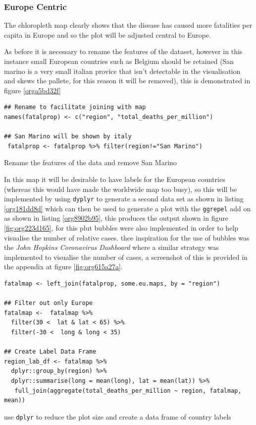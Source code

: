 \documentclass[11pt]{article}
\begin{document}
\subsubsection{Europe Centric}
\label{sec:org70b837a}
The chloropleth map clearly shows that the disease has caused more fatalities
per capita in Europe and so the plot will be adjusted central to Europe.

As before it is necessary to rename the features of the dataset, however in this
instance small European countries such as Belgium should be retained (San marino
is a very small italian provice that isn't detectable in the visualisation and
skews the pallete, for this reason it will be removed), this is demonstrated in
figure \ref{orga5bd32f}

\begin{listing}[htbp]
\begin{verbatim}
## Rename to facilitate joining with map
names(fatalprop) <- c("region", "total_deaths_per_million")

## San Marino will be shown by italy
 fatalprop <- fatalprop %>% filter(region!="San Marino")
\end{verbatim}
\caption{\label{orga5bd32f}Rename the features of the data and remove San Marino}
\end{listing}

In this map it will be desirable to have labels for the European countries
(whereas this would have made the worldwide map too busy), so this will be
implemented by using \texttt{dyplyr} to generate a second data set as shown in listing
\ref{org181dd8d} which can then be used to generate a plot with the \texttt{ggrepel} add on as shown in listing \ref{org8902b95}, this
produces the output shown in figure \ref{fig:org223d165}, for this plut bubbles were also implemented in order to help visualise the number of relative cases.
thee inspiration for the use of bubbles was the \emph{John Hopkins Coronavirus Dashboard} \cite{2020o} where a similar strategy was implemented to visualise the number of cases, a screenshot of this is provided in the appendix at figure \ref{fig:org615a27a}.

\begin{listing}[htbp]
\begin{verbatim}
fatalmap <- left_join(fatalprop, some.eu.maps, by = "region")

## Filter out only Europe
fatalmap <-  fatalmap %>%
  filter(30 <  lat & lat < 65) %>%
  filter(-30 <  long & long < 35)

## Create Label Data Frame
region_lab_df <- fatalmap %>%
  dplyr::group_by(region) %>%
  dplyr::summarise(long = mean(long), lat = mean(lat)) %>%
   full_join(aggregate(total_deaths_per_million ~ region, fatalmap, mean))
\end{verbatim}
\caption{\label{org181dd8d}use \texttt{dplyr} to reduce the plot size and create a data frame of country labels}
\end{listing}
\end{document}
